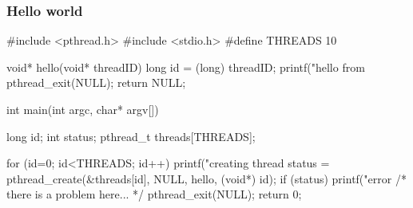 %
%
%
%


\begin{frame}[fragile]
%
  \frametitle{Hello world}
  \label{slide:hello-world-threads}
%
  \begin{C}
#include <pthread.h>
#include <stdio.h>
#define THREADS 10

void* hello(void* threadID) {
    long id = (long) threadID;
    printf("hello from %
    pthread_exit(NULL);
    return NULL;
}

int main(int argc, char* argv[]) {
    long id;
    int status;
    pthread_t threads[THREADS];

    for (id=0; id<THREADS; id++) {
        printf("creating thread %
        status = pthread_create(&threads[id], NULL, hello, (void*) id);
        if (status) {
            printf("error %
        }
    }
    /* there is a problem here... */
    pthread_exit(NULL);
    return 0;
}
  \end{C}
%
\end{frame}

